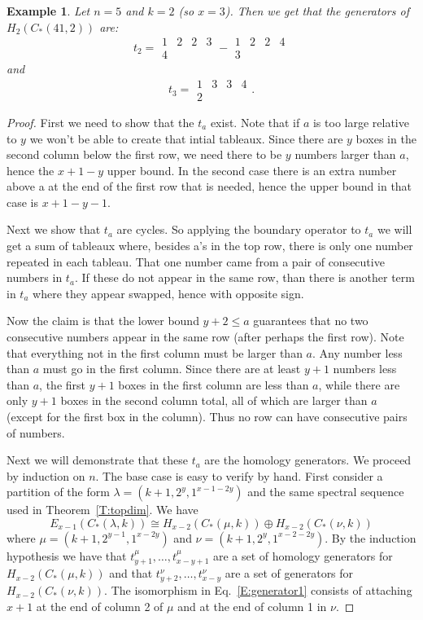 \documentclass{amsart}
\newtheorem{example}[theorem]{Example}
\begin{document}
\begin{example}
  Let $n=5$ and $k=2$ (so $x=3$). Then we get that the generators of $H_2(C_*(41,2))$ are:
  $$t_2 = \begin{array}{cccc} 1 & 2 & 2 & 3 \\ 4 \end{array}
        - \begin{array}{cccc} 1 & 2 & 2 & 4 \\ 3 \end{array}$$ and
  $$t_3 = \begin{array}{cccc} 1 & 3 & 3 & 4 \\ 2 \end{array}.$$
\end{example}
\begin{proof}
  First we need to show that the $t_a$ exist. Note that if $a$ is too large relative to $y$ we won't be able to create that intial tableaux. 
  Since there are $y$ boxes in the second column below the first row, we need there to be $y$ numbers larger than $a$, hence the $x+1-y$ upper bound. In the 
  second case there is an extra number above a at the end of the first row that is needed, hence the upper bound in that case is $x+1-y-1$.
  

  Next we show that $t_a$ are cycles. So applying the boundary operator to  $t_a$ we will get a sum of tableaux where, besides 
  a's in the top row, there is only one number repeated in each tableau. That one number came from a pair of consecutive numbers in $t_a$.
  If these do not appear in the same row, than there is another term in $t_a$ where they appear swapped, hence with opposite sign. 

  Now the claim is that the lower bound $y+2 \le a$ guarantees that no two consecutive numbers appear in the same row (after perhaps the 
  first row). Note that everything not in the first column must be larger than $a$. Any number less than $a$
  must go in the first column. Since there are at least $y+1$ numbers less than $a$, the first $y+1$ boxes in the first column are less 
  than $a$, while there are only $y+1$ boxes in the second column total, all of which are larger than $a$ (except for the first box in the
  column). Thus no row can have consecutive pairs of numbers.

  Next we will demonstrate that these $t_a$ are the homology generators. We proceed by induction on $n$. The base case is easy to verify by 
  hand. First  consider a partition of the form $\lambda = (k+1, 2^y, 1^{x-1-2y})$ and the same spectral sequence used in 
  Theorem~\ref{T:topdim}. We have 
  \begin{equation} \label{E:generator1} 
    E_{x-1}(C_*(\lambda,k)) \cong H_{x-2}(C_*(\mu,k)) \oplus H_{x-2}(C_*(\nu,k))
  \end{equation}
  where $\mu = (k+1, 2^{y-1}, 1^{x-2y})$ and
  $\nu = (k+1, 2^y, 1^{x-2-2y})$. By the induction hypothesis we have that $t^{\mu}_{y+1}, \ldots, t^\mu_{x-y+1}$ are a set of homology 
  generators for $H_{x-2}(C_*(\mu,k))$ and that $t^{\nu}_{y+2}, \ldots, t^\nu_{x-y}$ are a set of generators for $H_{x-2}(C_*(\nu,k))$. The isomorphism in
  Eq.~\ref{E:generator1} consists of attaching $x+1$ at the end of column 2 of $\mu$ and at the end of column 1 in $\nu$. 


\end{proof}
\end{document}
